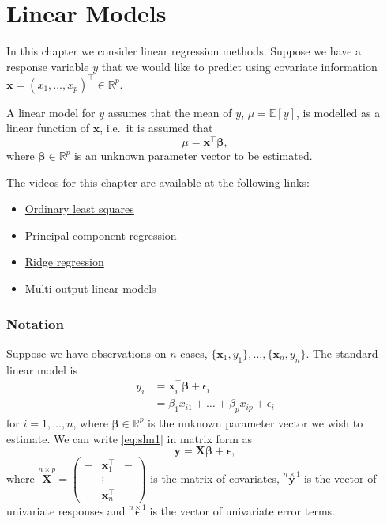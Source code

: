 \documentclass[
]{book}
\providecommand{\tightlist}{%
  \setlength{\itemsep}{0pt}\setlength{\parskip}{0pt}}
\theoremstyle{definition}
\theoremstyle{definition}
\theoremstyle{definition}
\theoremstyle{definition}
\theoremstyle{remark}
\begin{document}
\chapter{Linear Models}\label{lm}

In this chapter we consider linear regression methods. Suppose we have a response variable \(y\) that we would like to predict using covariate information \(\mathbf x=(x_1, \ldots, x_p)^\top \in \mathbb{R}^p\).

A linear model for \(y\) assumes that the mean of \(y\), \(\mu={\mathbb{E}}[y]\), is modelled as a linear function of \(\mathbf x\), i.e.~it is assumed that
\[
\mu = \mathbf x^\top \boldsymbol \beta,
\]
where \(\boldsymbol \beta\in \mathbb{R}^p\) is an unknown parameter vector to be estimated.

The videos for this chapter are available at the following links:

\begin{itemize}
\tightlist
\item
  \href{https://mediaspace.nottingham.ac.uk/media/Linear+ModelsA+Ordinary+Least+Squares/1_ytvk0uc6}{Ordinary least squares}
\item
  \href{https://mediaspace.nottingham.ac.uk/media/Linear+ModelsA+Principal+Component+Regression/1_h0l11uvw}{Principal component regression}
\item
  \href{https://mediaspace.nottingham.ac.uk/media/Linear+ModelsA+Ridge+Regression/1_rjnxkukd}{Ridge regression}
\item
  \href{https://mediaspace.nottingham.ac.uk/media/Linear+modelsA+multi-output+models/1_f61kjm7u}{Multi-output linear models}
\end{itemize}

\subsection*{Notation}\label{notation-3}

Suppose we have observations on \(n\) cases, \(\{\mathbf x_1, y_1\}, \ldots, \{\mathbf x_n, y_n\}\). The standard linear model is
\begin{align}
y_i &= \mathbf x_i^\top \boldsymbol \beta+\epsilon_i
\label{eq:slm1}\\
&=\beta_1 x_{i1}+\ldots+\beta_p x_{ip}+\epsilon_i
\end{align}
for \(i=1, \ldots , n\),
where \(\boldsymbol \beta\in \mathbb{R}^p\) is the unknown parameter vector we wish to estimate. We can write \eqref{eq:slm1} in matrix form as
\begin{equation}
\mathbf y=\mathbf X\boldsymbol \beta+{\pmb \epsilon},
\label{eq:slm2}
\end{equation}
where \(\stackrel{n \times p}{\mathbf X}= \begin{pmatrix} - & \mathbf x_1^\top &-\\
&\vdots&\\
-&\mathbf x_n^\top&-\end{pmatrix}\) is the matrix of covariates,
\(\stackrel{n \times 1}{\mathbf y}\) is the vector of univariate responses and \(\stackrel{n \times 1}{\pmb \epsilon}\) is the vector of univariate error terms.
\end{document}
